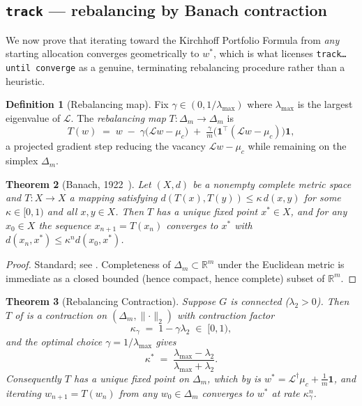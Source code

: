 \documentclass[11pt,a4paper]{article}
\theoremstyle{thmstyle}
\newtheorem{theorem}{Theorem}[section]
\theoremstyle{definition}
\newtheorem{definition}[theorem]{Definition}
\theoremstyle{remark}
\newcommand{\R}{\mathbb{R}}
\newcommand{\sh}[1]{\texttt{#1}}
\newcommand{\norm}[1]{\lVert#1\rVert}
\newcommand{\Lap}{\mathcal{L}}
\newcommand{\simplex}{\Delta_m}
\begin{document}
\subsection{\texorpdfstring{\sh{track} --- rebalancing by Banach contraction}{track --- rebalancing}}
\label{sec:stdlib-track}

We now prove that iterating toward the Kirchhoff Portfolio Formula from
\emph{any} starting allocation converges geometrically to $w^\ast$,
which is what licenses \sh{track\ldots until\ converge} as a genuine,
terminating rebalancing procedure rather than a heuristic.

\begin{definition}[Rebalancing map]
\label{def:rebalance-map}
Fix $\gamma\in(0,1/\lambda_{\max})$ where $\lambda_{\max}$ is the
largest eigenvalue of $\Lap$. The \emph{rebalancing map}
$T:\simplex\to\simplex$ is
\[
T(w) \;=\; w \;-\; \gamma\bigl(\Lap w-\mu_c\bigr) \;+\; \tfrac{\gamma}{m}\bigl(\mathbf{1}^\top(\Lap w-\mu_c)\bigr)\mathbf{1},
\]
a projected gradient step reducing the vacancy $\Lap w-\mu_c$ while
remaining on the simplex $\simplex$.
\end{definition}

\begin{theorem}[Banach, 1922~\citep{banach1922}]
\label{thm:banach}
Let $(X,d)$ be a nonempty complete metric space and $T:X\to X$ a
mapping satisfying $d(T(x),T(y))\le\kappa\,d(x,y)$ for some
$\kappa\in[0,1)$ and all $x,y\in X$. Then $T$ has a unique fixed point
$x^\ast\in X$, and for any $x_0\in X$ the sequence
$x_{n+1}=T(x_n)$ converges to $x^\ast$ with
$d(x_n,x^\ast)\le\kappa^n d(x_0,x^\ast)$.
\end{theorem}

\begin{proof}
Standard; see \citep{banach1922}. Completeness of $\simplex\subset\R^m$
under the Euclidean metric is immediate as a closed bounded (hence
compact, hence complete) subset of $\R^m$.
\end{proof}

\begin{theorem}[Rebalancing Contraction]
\label{thm:contraction}
Suppose $G$ is connected ($\lambda_2>0$). Then $T$ of
 is a contraction on $(\simplex,\norm{\cdot}_2)$
with contraction factor
\[
\kappa_\gamma \;=\; 1-\gamma\lambda_2 \;\in\;[0,1),
\]
and the optimal choice $\gamma=1/\lambda_{\max}$ gives
\[
\kappa^\ast \;=\; \frac{\lambda_{\max}-\lambda_2}{\lambda_{\max}+\lambda_2}.
\]
Consequently $T$ has a unique fixed point on $\simplex$, which by
 is $w^\ast=\Lap^{\dagger}\mu_c+\tfrac1m\mathbf{1}$,
and iterating $w_{n+1}=T(w_n)$ from any $w_0\in\simplex$ converges to
$w^\ast$ at rate $\kappa_\gamma^n$.
\end{theorem}
\end{document}
